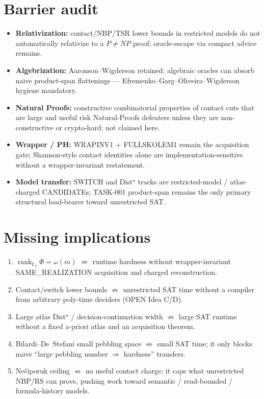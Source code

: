 \documentclass[11pt]{article}
\begin{document}
\section*{Barrier audit}
\begin{itemize}
\item \textbf{Relativization:} contact/NBP/TSR lower bounds in restricted models do not
  automatically relativize to a $P\neq NP$ proof; oracle-escape via compact advice remains.
\item \textbf{Algebrization:} Aaronson--Wigderson retained; algebraic oracles can absorb
  naive product-span flattenings --- Efremenko--Garg--Oliveira--Wigderson hygiene mandatory.
\item \textbf{Natural Proofs:} constructive combinatorial properties of contact cuts that are
  large and useful risk Natural-Proofs defeaters unless they are non-constructive or
  crypto-hard; not claimed here.
\item \textbf{Wrapper / PH:} WRAPINV1 + FULLSKOLEM1 remain the acquisition gate;
  Shannon-style contact identities alone are implementation-sensitive without a
  wrapper-invariant restatement.
\item \textbf{Model transfer:} SWITCH and Dist$^\star$ tracks are restricted-model /
  atlas-charged CANDIDATEs; TASK-001 product-span remains the only primary structural
  load-bearer toward unrestricted SAT.
\end{itemize}

\section*{Missing implications}
\begin{enumerate}
\item $\operatorname{rank}_{\mathbb F_2}\Phi=\omega(m)$ $\not\Rightarrow$ runtime hardness without
  wrapper-invariant SAME\_REALIZATION acquisition and charged reconstruction.
\item Contact/switch lower bounds $\not\Rightarrow$ unrestricted SAT time without a compiler
  from arbitrary poly-time deciders (OPEN Idea C/D).
\item Large atlas Dist$^\star$ / decision-continuation width $\not\Rightarrow$ large SAT runtime
  without a fixed a-priori atlas and an acquisition theorem.
\item Bilardi--De~Stefani small pebbling space $\not\Rightarrow$ small SAT time; it only
  blocks naive ``large pebbling number $\Rightarrow$ hardness'' transfers.
\item Ne\v{c}iporuk ceiling $\not\Rightarrow$ no useful contact charge; it caps what unrestricted
  NBP/RS can prove, pushing work toward semantic / read-bounded / formula-history models.
\end{enumerate}
\end{document}

